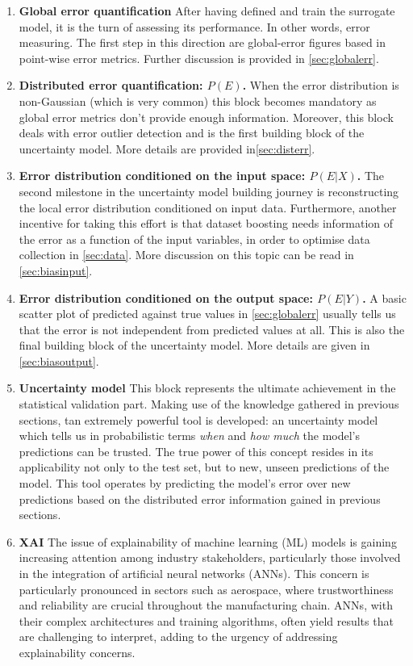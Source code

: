 \begin{enumerate}
	\item\label{item:errquant}\textbf{Global error quantification}
	After having defined and train the surrogate model, it is the turn of assessing its performance. In other words, error measuring. The first step in this direction are global-error figures based in point-wise error metrics. Further discussion is provided in \autoref{sec:globalerr}.
	\item\label{item:errdist}\textbf{Distributed error quantification: $P(E)$.}
	When the error distribution is non-Gaussian (which is very common) this block becomes mandatory as global error metrics don't provide enough information. Moreover, this block deals with error outlier detection and is the first building block of the uncertainty model. More details are provided in\autoref{sec:disterr}.
	\item\label{item:errinput}\textbf{Error distribution conditioned on the input space: $P(E|X)$.}
	The second milestone in the uncertainty model building journey is reconstructing the local error distribution conditioned on input data. Furthermore, another incentive for taking this effort is that dataset boosting needs information of the error as a function of the input variables, in order to optimise data collection in \autoref{sec:data}. More discussion on this topic can be read in \autoref{sec:biasinput}.
	
	\item\label{item:errout}\textbf{Error distribution conditioned on the output space: $P(E|Y)$.}
	A basic scatter plot of predicted against true values in \autoref{sec:globalerr} usually tells us that the error is not independent from predicted values at all. This is also the final building block of the uncertainty model. More details are given in \autoref{sec:biasoutput}.
	\item\label{item:uncertainty}\textbf{Uncertainty model}
	This block represents the ultimate achievement in the statistical validation part. Making use of the knowledge gathered in previous sections, tan extremely powerful tool is developed: an uncertainty model which tells us in probabilistic terms \textit{when} and \textit{how much} the model's predictions can be trusted. The true power of this concept resides in its applicability not only to the test set, but to new, unseen predictions of the model. This tool operates by predicting the model's error over new predictions based on the distributed error information gained in previous sections.
	
	\item\label{item:XAI}\textbf{XAI}
	The issue of explainability of machine learning (ML) models is gaining increasing attention among industry stakeholders, particularly those involved in the integration of artificial neural networks (ANNs). This concern is particularly pronounced in sectors such as aerospace\cite{force2021concepts,roadmap2021easa}, where trustworthiness and reliability are crucial throughout the manufacturing chain. ANNs, with their complex architectures and training algorithms, often yield results that are challenging to interpret, adding to the urgency of addressing explainability concerns.
	

\end{enumerate}
